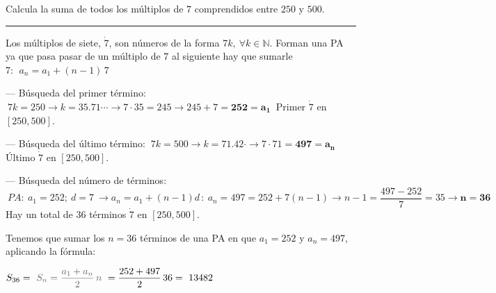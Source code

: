 \begin{miejercicio}

Calcula la suma de todos los múltiplos de $7$ comprendidos entre $250$ y $500$.

\rule{250pt}{0.1pt}
\vspace{2mm}

Los múltiplos de siete, $\dot{7}$, son números de la forma $7k,\ \forall k\in \mathbb N$. Forman una PA ya que pasa pasar de un múltiplo de $7$ al siguiente hay que sumarle $7:\ \ a_n=a_1+(n-1)\, 7$

\vspace{2mm}--- Búsqueda del primer término: $\ 7k=250 \to k=35.71\cdots \to 7\cdot 35=245 \to 245+7=\boldsymbol{252=a_1}\ $ Primer $\dot{7}$ en $[250,500]$.

\vspace{2mm}--- Búsqueda del último término: $\ 7k=500 \to k=71.42\cdot \to 7\cdot 71=\boldsymbol{497=a_n}\ $ Último $\dot{7}$ en $[250,500]$.

\vspace{2mm}--- Búsqueda del número de términos: $\ PA:\ a_1=252;\ d=7 \ \to a_n=a_1+(n-1)d\, : \ a_n=497=252+7(n-1) \to n-1=\dfrac{497-252}{7}=35 \to \boldsymbol{n=36}\ $ Hay un total de $36$ términos $\dot{7}$ en $[250,500]$. 

\vspace{2mm}Tenemos que sumar los $n=36$ términos de una PA en que $a_1=252$ y $a_n=497$, aplicando la fórmula:

\vspace{2mm} $S_{36} =\  \textcolor{gris}{S_n=\dfrac{a_1+a_n}{2}\, n} \ = \dfrac{252+497}{2}\, 36= \ 13482$

\end{miejercicio}


\vspace{5mm}

